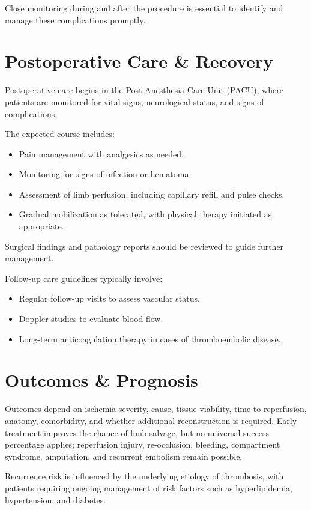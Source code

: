 Close monitoring during and after the procedure is essential to identify and manage these complications promptly.

\section*{Postoperative Care \& Recovery}

Postoperative care begins in the Post Anesthesia Care Unit (PACU), where patients are monitored for vital signs, neurological status, and signs of complications.

The expected course includes:

\begin{itemize}
    \item Pain management with analgesics as needed.
    \item Monitoring for signs of infection or hematoma.
    \item Assessment of limb perfusion, including capillary refill and pulse checks.
    \item Gradual mobilization as tolerated, with physical therapy initiated as appropriate.
\end{itemize}

Surgical findings and pathology reports should be reviewed to guide further management.

Follow-up care guidelines typically involve:

\begin{itemize}
    \item Regular follow-up visits to assess vascular status.
    \item Doppler studies to evaluate blood flow.
    \item Long-term anticoagulation therapy in cases of thromboembolic disease.
\end{itemize}

\section*{Outcomes \& Prognosis}

Outcomes depend on ischemia severity, cause, tissue viability, time to reperfusion, anatomy, comorbidity, and whether additional reconstruction is required. Early treatment improves the chance of limb salvage, but no universal success percentage applies; reperfusion injury, re-occlusion, bleeding, compartment syndrome, amputation, and recurrent embolism remain possible.

Recurrence risk is influenced by the underlying etiology of thrombosis, with patients requiring ongoing management of risk factors such as hyperlipidemia, hypertension, and diabetes.

